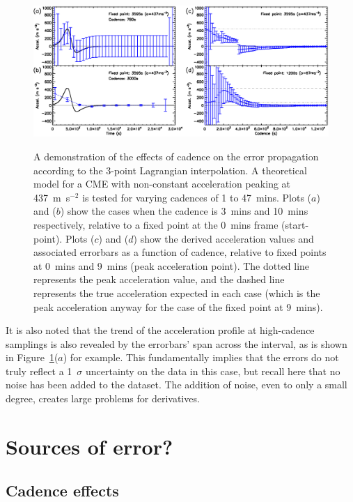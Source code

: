 \documentclass[structabstract]{aa}
\begin{document}
\begin{figure}[!t]
\centering
{\includegraphics[scale=0.55, trim=0 30 0 10, clip=true]{images/fig_cadence_4landscape.eps}}
\caption{A demonstration of the effects of cadence on the error propagation according to the 3-point Lagrangian interpolation. A theoretical model for a CME with non-constant acceleration peaking at 437~m~s$^{-2}$ is tested for varying cadences of 1 to 47~mins. Plots ($a$) and ($b$) show the cases when the cadence is 3~mins and 10~mins respectively, relative to a fixed point at the 0~mins frame (start-point). Plots ($c$) and ($d$) show the derived acceleration values and associated errorbars as a function of cadence, relative to fixed points at 0~mins and 9~mins (peak acceleration point). The dotted line represents the peak acceleration value, and the dashed line represents the true acceleration expected in each case (which is the peak acceleration anyway for the case of the fixed point at 9~mins).}
\label{fig_cadence_4}
\end{figure}

It is also noted that the trend of the acceleration profile at high-cadence samplings is also revealed by the errorbars' span across the interval, as is shown in Figure~\ref{fig_cadence_4}($a$) for example. This fundamentally implies that the errors do not truly reflect a 1~$\sigma$ uncertainty on the data in this case, but recall here that no noise has been added to the dataset. The addition of noise, even to only a small degree, creates large problems for derivatives.


\section{Sources of error?}
\label{sect:error_sources}

\subsection{Cadence effects}
\label{subsect:cadence}
\end{document}
